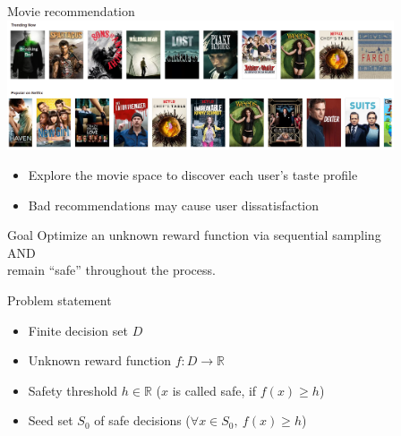 \documentclass[xetex,10pt,mathserif]{beamer}
\begin{document}
\begin{frame}{Movie recommendation}
\centering
\includegraphics[width=4.5in]{figures/netflix.png}
\vspace{2em}
\begin{itemize}
\item Explore the movie space to discover each user's taste profile
\vspace{0.5em}
\item Bad recommendations may cause user dissatisfaction
\end{itemize}
\end{frame}

\begin{frame}{Goal}
\centering
\large
Optimize an unknown reward function via sequential sampling\\[1em]
AND\\[1em]
remain ``safe'' throughout the process.
\end{frame}

\begin{frame}{Problem statement}
\begin{itemize}
\item<1-> Finite decision set $D$
\vspace{2em}
\item<2-> Unknown reward function $f : D \to \mathbb{R}$
\vspace{2em}
\item<3-> Safety threshold $h \in \mathbb{R}$ ($x$ is called safe, if $f(x) \geq h$)
\vspace{2em}
\item<4-> Seed set $S_0$ of safe decisions ($\forall x \in S_0,\ f(x) \geq h$)
\end{itemize}
\end{frame}
\end{document}
